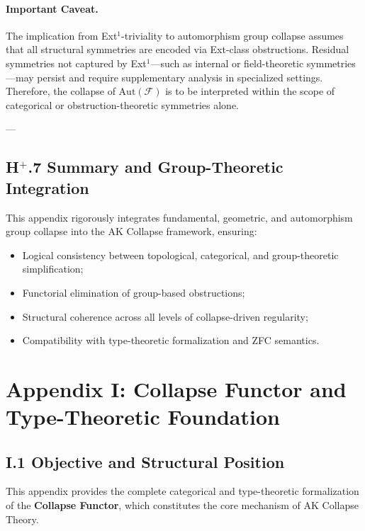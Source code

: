 \documentclass[11pt]{article}
\begin{document}
\paragraph{Important Caveat.}
The implication from Ext$^1$-triviality to automorphism group collapse assumes that all structural symmetries are encoded via Ext-class obstructions. Residual symmetries not captured by Ext$^1$—such as internal or field-theoretic symmetries—may persist and require supplementary analysis in specialized settings. Therefore, the collapse of $\mathrm{Aut}(\mathcal{F})$ is to be interpreted within the scope of categorical or obstruction-theoretic symmetries alone.

---

\subsection*{H$^{+}$.7 Summary and Group-Theoretic Integration}

This appendix rigorously integrates fundamental, geometric, and automorphism group collapse into the AK Collapse framework, ensuring:

\begin{itemize}
    \item Logical consistency between topological, categorical, and group-theoretic simplification;
    \item Functorial elimination of group-based obstructions;
    \item Structural coherence across all levels of collapse-driven regularity;
    \item Compatibility with type-theoretic formalization and ZFC semantics.
\end{itemize}



\section*{Appendix I: Collapse Functor and Type-Theoretic Foundation}

\subsection*{I.1 Objective and Structural Position}

This appendix provides the complete categorical and type-theoretic formalization of the \textbf{Collapse Functor}, which constitutes the core mechanism of AK Collapse Theory.
\end{document}
